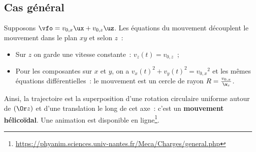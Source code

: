 \documentclass[../../main/main.tex]{subfiles}
\begin{document}
\subsection{Cas général}
Supposons $\vfo = v_{0,x}\ux + v_{0,z}\uz$. Les équations du mouvement
découplent le mouvement dans le plan $xy$ et selon $z$~:
\begin{itemize}
	\item Sur $z$ on garde une vitesse constante~: $v_z(t) = v_{0,z}$~;
	\item Pour les composantes sur $x$ et $y$, on a $v_x(t)^2 + v_y(t)^2 =
		      v_{0,x}{}^2$ et les mêmes équations différentielles~: le mouvement est
	      un cercle de rayon $R = \frac{v_{0,x}}{\w_c}$.
\end{itemize}
Ainsi, la trajectoire est la superposition d'une rotation circulaire uniforme
autour de $(\Or z)$ et d'une translation le long de cet axe~: c'est un
\textbf{mouvement hélicoïdal}. Une animation est disponible en
ligne\footnote{\url{https://phyanim.sciences.univ-nantes.fr/Meca/Charges/general.php}}.
\end{document}
